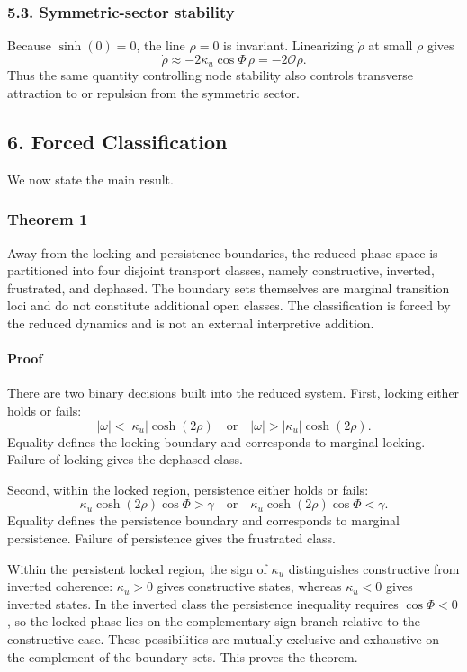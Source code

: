 \documentclass[
]{article}
\begin{document}
\subsubsection{5.3. Symmetric-sector
stability}\label{symmetric-sector-stability}

Because \(\sinh(0)=0\), the line \(\rho=0\) is invariant. Linearizing
\(\dot{\rho}\) at small \(\rho\) gives \[
\dot{\rho} \approx -2\kappa_{u}\cos\Phi \, \rho = -2\mathcal{O}\rho.
\] Thus the same quantity controlling node stability also controls
transverse attraction to or repulsion from the symmetric sector.

\subsection{6. Forced Classification}\label{forced-classification}

We now state the main result.

\subsubsection{Theorem 1}\label{theorem-1}

Away from the locking and persistence boundaries, the reduced phase
space is partitioned into four disjoint transport classes, namely
constructive, inverted, frustrated, and dephased. The boundary sets
themselves are marginal transition loci and do not constitute additional
open classes. The classification is forced by the reduced dynamics and
is not an external interpretive addition.

\paragraph{Proof}\label{proof-4}

There are two binary decisions built into the reduced system. First,
locking either holds or fails: \[
|\omega| < |\kappa_{u}|\cosh(2\rho)
\quad \text{or} \quad
|\omega| > |\kappa_{u}|\cosh(2\rho).
\] Equality defines the locking boundary and corresponds to marginal
locking. Failure of locking gives the dephased class.

Second, within the locked region, persistence either holds or fails: \[
\kappa_{u}\cosh(2\rho)\cos\Phi > \gamma
\quad \text{or} \quad
\kappa_{u}\cosh(2\rho)\cos\Phi < \gamma.
\] Equality defines the persistence boundary and corresponds to marginal
persistence. Failure of persistence gives the frustrated class.

Within the persistent locked region, the sign of \(\kappa_{u}\)
distinguishes constructive from inverted coherence: \(\kappa_{u} > 0\)
gives constructive states, whereas \(\kappa_{u} < 0\) gives inverted
states. In the inverted class the persistence inequality requires
\(\cos\Phi < 0\), so the locked phase lies on the complementary sign
branch relative to the constructive case. These possibilities are
mutually exclusive and exhaustive on the complement of the boundary
sets. This proves the theorem.
\end{document}
